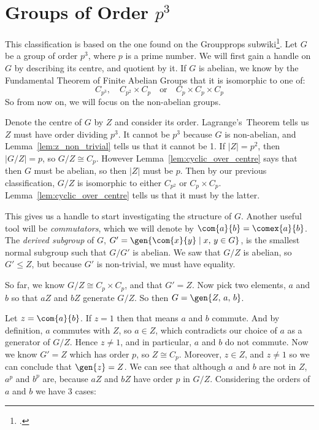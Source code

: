 \section{Groups of Order \(p^3\)}
This classification is based on the one found on the Groupprops subwiki\footcite{pcubed}.
Let \(G\) be a group of order \(p^3\), where \(p\) is a prime number.
We will first gain a handle on \(G\) by describing its centre, and quotient by it.
If \(G\) is abelian, we know by the Fundamental Theorem of Finite Abelian Groups that it is isomorphic to one of:
\[ C_{p^3}, \quad C_{p^2} \times C_p \quad \text{or} \quad C_p \times C_p \times C_p\]
So from now on, we will focus on the non-abelian groups.

Denote the centre of \(G\) by \(Z\) and consider its order.
Lagrange's~Theorem tells us \(Z\) must have order dividing \(p^3\).
It cannot be \(p^3\) because \(G\) is non-abelian, and Lemma~\ref{lem:z_non_trivial} tells us that it cannot be 1.
If \(|Z| = p^2\), then \(|G/Z| = p\), so \(G/Z \cong C_p\).
However Lemma~\ref{lem:cyclic_over_centre} says that then \(G\) must be abelian, so then \(|Z|\) must be \(p\).
Then by our previous classification, \(G/Z\) is isomorphic to either \(C_{p^2}\) or \(C_p \times C_p\).
Lemma~\ref{lem:cyclic_over_centre} tells us that it must by the latter.

This gives us a handle to start investigating the structure of \(G\).
Another useful tool will be \emph{commutators}, which we will denote by \(\com{a}{b} = \comex{a}{b}\).
The \emph{derived subgroup} of \(G\), \(G' = \gen{\com{x}{y} \mid x,\,y \in G}\), is the smallest normal
subgroup such that \(G/G'\) is abelian.
We saw that \(G/Z\) is abelian, so \(G' \leqslant Z\), but because \(G'\) is non-trivial, we must have equality.

So far, we know \(G/Z \cong C_p \times C_p\), and that \(G' = Z\).
Now pick two elements, \(a\) and \(b\) so that \(aZ\) and \(bZ\) generate \(G/Z\).
So then \(G = \gen{Z,\,a,\,b}\).

Let \(z = \com{a}{b}\).
If \(z = 1\) then that means \(a\) and \(b\) commute.
And by definition, \(a\) commutes with \(Z\), so \(a \in Z\), which contradicts our choice of \(a\) as a generator of
\(G/Z\).
Hence \(z \neq 1\), and in particular, \(a\) and \(b\) do not commute.
Now we know \(G' = Z\) which has order \(p\), so \(Z \cong C_p\).
Moreover, \(z \in Z\), and \(z \neq 1\) so we can conclude that \(\gen{z} = Z\).
We can see that although \(a\) and \(b\) are not in \(Z\), \(a^p\) and \(b^p\) are, because \(aZ\) and \(bZ\) have order
\(p\) in \(G/Z\).
Considering the orders of \(a\) and \(b\) we have 3 cases:

